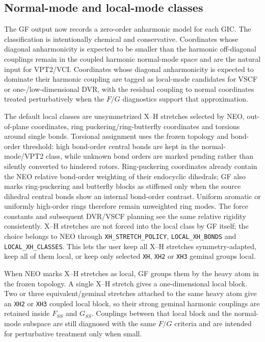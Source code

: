 \documentclass[11pt]{article}
\begin{document}
\subsection{Normal-mode and local-mode classes}

The GF output now records a zero-order anharmonic model for each GIC.  The
classification is intentionally chemical and conservative.  Coordinates whose
diagonal anharmonicity is expected to be smaller than the harmonic
off-diagonal couplings remain in the coupled harmonic normal-mode space and are
the natural input for VPT2/VCI.  Coordinates whose diagonal anharmonicity is
expected to dominate their harmonic coupling are tagged as local-mode
candidates for VSCF or one-/low-dimensional DVR, with the residual coupling to
normal coordinates treated perturbatively when the \(F/G\) diagnostics support
that approximation.

The default local classes are unsymmetrized X--H stretches selected by NEO,
out-of-plane coordinates, ring puckering/ring-butterfly coordinates and
torsions around single bonds.  Torsional assignment uses the frozen topology
and bond-order threshold: high bond-order central bonds are kept in the
normal-mode/VPT2 class, while unknown bond orders are marked pending rather
than silently converted to hindered rotors.  Ring-puckering coordinates already
contain the NEO relative bond-order weighting of their endocyclic dihedrals;
GF also marks ring-puckering and butterfly blocks as stiffened only when the
source dihedral central bonds show an internal bond-order contrast.  Uniform
aromatic or uniformly high-order rings therefore remain unweighted ring modes.
The force constants and subsequent DVR/VSCF planning see the same relative
rigidity consistently.
X--H stretches are not forced into the local class by GF itself; the choice belongs to NEO through
\texttt{XH\_STRETCH\_POLICY}, \texttt{LOCAL\_XH\_BONDS} and
\texttt{LOCAL\_XH\_CLASSES}.  This lets the user keep all X--H stretches
symmetry-adapted, keep all of them local, or keep only selected \texttt{XH},
\texttt{XH2} or \texttt{XH3} geminal groups local.

When NEO marks X--H stretches as local, GF groups them by the heavy atom in the
frozen topology.  A single X--H stretch gives a one-dimensional local block.
Two or three equivalent/geminal stretches attached to the same heavy atom give
an \texttt{XH2} or \texttt{XH3} coupled local block, so their strong geminal
harmonic couplings are retained inside \(F_{SS}\) and \(G_{SS}\).  Couplings
between that local block and the normal-mode subspace are still diagnosed with
the same \(F/G\) criteria and are intended for perturbative treatment only when
small.
\end{document}
